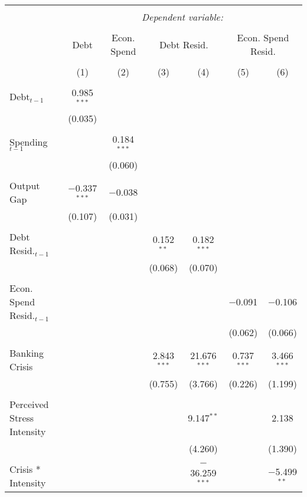 
\begingroup 
\tiny 
\begin{tabular}{@{\extracolsep{5pt}}lcccccc} 
\\[-1.8ex]\hline 
\hline \\[-1.8ex] 
 & \multicolumn{6}{c}{\textit{Dependent variable:}} \\ 
\cline{2-7} 
\\[-1.8ex] & Debt & Econ. Spend & \multicolumn{2}{c}{Debt Resid.} & \multicolumn{2}{c}{Econ. Spend Resid.} \\ 
\\[-1.8ex] & (1) & (2) & (3) & (4) & (5) & (6)\\ 
\hline \\[-1.8ex] 
 Debt$_{t-1}$ & 0.985$^{***}$ &  &  &  &  &  \\ 
  & (0.035) &  &  &  &  &  \\ 
  & & & & & & \\ 
 Spending$_{t-1}$ &  & 0.184$^{***}$ &  &  &  &  \\ 
  &  & (0.060) &  &  &  &  \\ 
  & & & & & & \\ 
 Output Gap & $-$0.337$^{***}$ & $-$0.038 &  &  &  &  \\ 
  & (0.107) & (0.031) &  &  &  &  \\ 
  & & & & & & \\ 
 Debt Resid.$_{t-1}$ &  &  & 0.152$^{**}$ & 0.182$^{***}$ &  &  \\ 
  &  &  & (0.068) & (0.070) &  &  \\ 
  & & & & & & \\ 
 Econ. Spend Resid.$_{t-1}$ &  &  &  &  & $-$0.091 & $-$0.106 \\ 
  &  &  &  &  & (0.062) & (0.066) \\ 
  & & & & & & \\ 
 Banking Crisis &  &  & 2.843$^{***}$ & 21.676$^{***}$ & 0.737$^{***}$ & 3.466$^{***}$ \\ 
  &  &  & (0.755) & (3.766) & (0.226) & (1.199) \\ 
  & & & & & & \\ 
 Perceived Stress Intensity &  &  &  & 9.147$^{**}$ &  & 2.138 \\ 
  &  &  &  & (4.260) &  & (1.390) \\ 
  & & & & & & \\ 
 Crisis * Intensity &  &  &  & $-$36.259$^{***}$ &  & $-$5.499$^{**}$ \\ 

\end{tabular}
